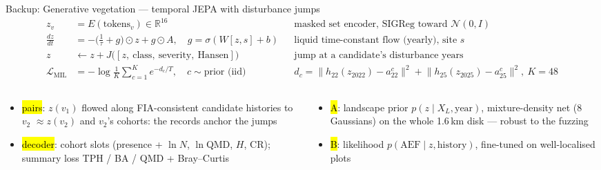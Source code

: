 \begin{frame}{Backup: Generative vegetation — temporal JEPA with disturbance jumps}
\footnotesize
\begin{align*}
z_v &= E(\text{tokens}_v)\in\mathbb R^{16} &&\text{masked set encoder, SIGReg toward }\mathcal N(0,I)\\
\tfrac{dz}{dt} &= -\bigl(\tfrac1\tau+g\bigr)\odot z+g\odot A,\quad g=\sigma(W[z,s]+b) &&\text{liquid time-constant flow (yearly), site }s\\
z &\leftarrow z+J\bigl([z,\ \text{class},\ \text{severity},\ \text{Hansen}]\bigr) &&\text{jump at a candidate's disturbance years}\\
\mathcal L_{\text{MIL}} &= -\log\tfrac1K\textstyle\sum_{c=1}^{K}e^{-d_c/T},\quad c\sim\text{prior (iid)} &&d_c=\lVert h_{22}(z_{2022})-a^c_{22}\rVert^2+\lVert h_{25}(z_{2025})-a^c_{25}\rVert^2,\ K{=}48
\end{align*}
\vspace{-6pt}
\scriptsize
\begin{columns}[T]
\begin{column}{0.5\textwidth}
\begin{itemize}\setlength\itemsep{1pt}
\item \hl{pairs}: $z(v_1)$ flowed along FIA-consistent candidate histories to $v_2$ $\approx z(v_2)$ and $v_2$'s cohorts: the records anchor the jumps
\item \hl{decoder}: cohort slots (presence + $\ln N$, $\ln$QMD, $H$, CR); summary loss TPH / BA / QMD + Bray–Curtis
\end{itemize}
\end{column}
\begin{column}{0.48\textwidth}
\begin{itemize}\setlength\itemsep{1pt}
\item \hl{A}: landscape prior $p(z\mid X_L,\text{year})$, mixture-density net (8 Gaussians) on the whole 1.6\,km disk — robust to the fuzzing
\item \hl{B}: likelihood $p(\text{AEF}\mid z,\text{history})$, fine-tuned on well-localised plots
\end{itemize}
\end{column}
\end{columns}
\end{frame}

